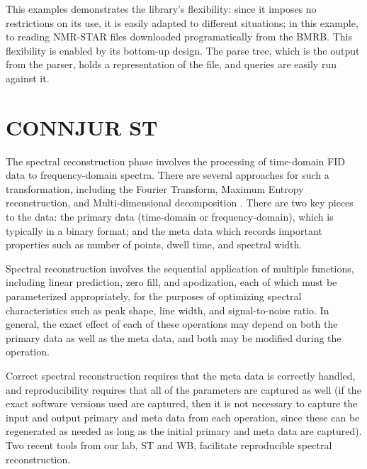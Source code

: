This examples demonstrates the library's flexibility: since it imposes
no restrictions on its use, it is easily adapted to
different situations; in this example, to reading NMR-STAR files downloaded
programatically from the BMRB.  This flexibility is enabled by its bottom-up
design.  The parse tree, which is the output from the parser, holds a 
representation of the file, and queries are easily run against it.


\section{CONNJUR ST}
The spectral reconstruction phase involves the processing of time-domain 
FID data to frequency-domain spectra.  There are several approaches for such
a transformation, including the Fourier Transform, Maximum Entropy reconstruction,
and Multi-dimensional decomposition \cite{nmrpipe, rnmrtk, mdd}.  There are
two key pieces to the data: the primary data (time-domain or frequency-domain),
which is typically in a binary format; and the meta data which records
important properties such as number of points, dwell time, and spectral width.

Spectral reconstruction involves the sequential application
of multiple functions, including linear prediction, zero fill, and apodization,
each of which must be parameterized appropriately, for the purposes of 
optimizing spectral characteristics such as peak shape, line width, and
signal-to-noise ratio.  In general, the exact effect of each of these operations
may depend on both the primary data as well as the meta data, and both
may be modified during the operation.

Correct spectral reconstruction requires that the meta data is correctly 
handled, and reproducibility requires that all of the parameters are captured
as well (if the exact software versions used are captured, then it is not
necessary to capture the input and output primary and meta data from each
operation, since these can be regenerated as needed as long as the initial
primary and meta data are captured).  Two recent tools from our lab, ST 
\cite{connjur-st} and WB, facilitate reproducible spectral reconstruction.

